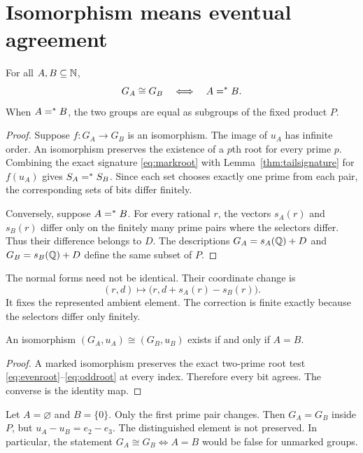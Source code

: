\section{Isomorphism means eventual agreement}
\begin{theorem}
\label{thm:isoclass}
For all $A,B\subseteq\mathbb N$,
\[
G_A\cong G_B\quad\Longleftrightarrow\quad A=^{*} B.
\]
When $A=^{*} B$, the two groups are equal as subgroups of the fixed product $P$.
\end{theorem}
\begin{proof}
Suppose $f:G_A\to G_B$ is an isomorphism. The image of $u_A$ has infinite order. An isomorphism preserves the existence of a $p$th root for every prime $p$. Combining the exact signature \eqref{eq:markroot} with Lemma~\ref{thm:tailsignature} for $f(u_A)$ gives $S_A=^{*} S_B$. Since each set chooses exactly one prime from each pair, the corresponding sets of bits differ finitely.

Conversely, suppose $A=^{*} B$. For every rational $r$, the vectors $s_A(r)$ and $s_B(r)$ differ only on the finitely many prime pairs where the selectors differ. Thus their difference belongs to $D$. The descriptions $G_A=s_A(\mathbb Q)+D$ and $G_B=s_B(\mathbb Q)+D$ define the same subset of $P$.
\end{proof}
The normal forms need not be identical. Their coordinate change is
\begin{equation}
\label{eq:transport}
(r,d)\longmapsto
\bigl(r,d+s_A(r)-s_B(r)\bigr).
\end{equation}
It fixes the represented ambient element. The correction is finite exactly because the selectors differ only finitely.

\begin{corollary}
\label{thm:markedclass}
An isomorphism $(G_A,u_A)\cong(G_B,u_B)$ exists if and only if $A=B$.
\end{corollary}
\begin{proof}
A marked isomorphism preserves the exact two-prime root test \eqref{eq:evenroot}--\eqref{eq:oddroot} at every index. Therefore every bit agrees. The converse is the identity map.
\end{proof}

\begin{example}
Let $A=\varnothing$ and $B=\{0\}$. Only the first prime pair changes. Then $G_A=G_B$ inside $P$, but $u_A-u_B=e_2-e_3$. The distinguished element is not preserved. In particular, the statement $G_A\cong G_B\iff A=B$ would be false for unmarked groups.
\end{example}

